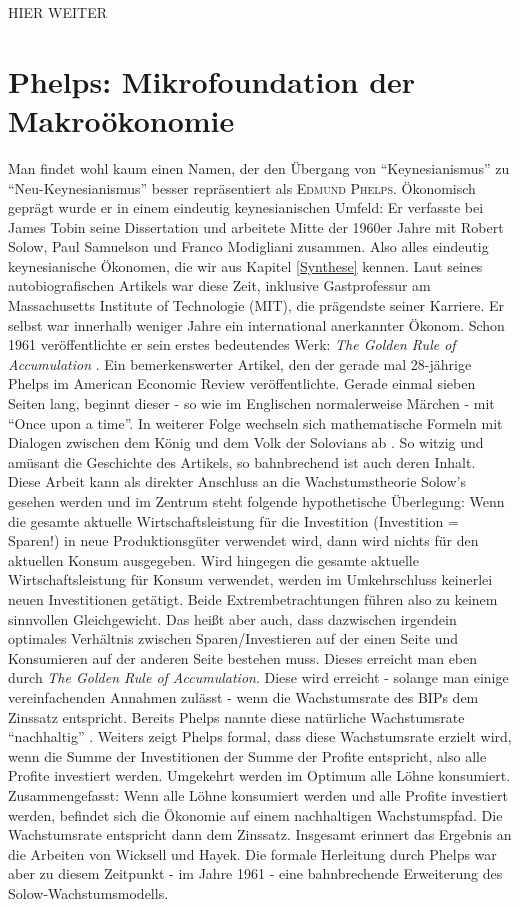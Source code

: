 HIER WEITER
 
 
 

\section{Phelps: Mikrofoundation der Makroökonomie}
\label{micmac}

Man findet wohl kaum einen Namen, der den Übergang von "`Keynesianismus"' zu "`Neu-Keynesianismus"' besser repräsentiert als \textsc{Edmund Phelps}. Ökonomisch geprägt wurde er in einem eindeutig keynesianischen Umfeld: Er verfasste bei James Tobin seine Dissertation und arbeitete Mitte der 1960er Jahre mit Robert Solow, Paul Samuelson und Franco Modigliani zusammen. Also alles eindeutig keynesianische Ökonomen, die wir aus Kapitel \ref{Synthese} kennen. Laut seines autobiografischen Artikels \textcite[S. 93]{Heertje1995} war diese Zeit, inklusive Gastprofessur am Massachusetts Institute of Technologie (MIT), die prägendste seiner Karriere. Er selbst war innerhalb weniger Jahre ein international anerkannter Ökonom. Schon 1961 veröffentlichte er sein erstes bedeutendes Werk: \textit{The Golden Rule of Accumulation} \parencite{Phelps1961}. Ein bemerkenswerter Artikel, den der gerade mal 28-jährige Phelps im American Economic Review veröffentlichte. Gerade einmal sieben Seiten lang, beginnt dieser - so wie im Englischen normalerweise Märchen  - mit "`Once upon a time"'. In weiterer Folge wechseln sich mathematische Formeln mit Dialogen zwischen dem König und dem Volk der Solovians ab \parencite[S. 640]{Phelps1961}. So witzig und amüsant die Geschichte des Artikels, so bahnbrechend ist auch deren Inhalt. Diese Arbeit kann als direkter Anschluss an die Wachstumstheorie Solow's gesehen werden und im Zentrum steht folgende hypothetische Überlegung: Wenn die gesamte aktuelle Wirtschaftsleistung für die Investition (Investition = Sparen!) in neue Produktionsgüter verwendet wird, dann wird nichts für den aktuellen Konsum ausgegeben. Wird hingegen die gesamte aktuelle Wirtschaftsleistung für Konsum verwendet, werden im Umkehrschluss keinerlei neuen Investitionen getätigt. Beide Extrembetrachtungen führen also zu keinem sinnvollen Gleichgewicht. Das heißt aber auch, dass dazwischen irgendein optimales Verhältnis zwischen Sparen/Investieren auf der einen Seite und Konsumieren auf der anderen Seite bestehen muss. Dieses erreicht man eben durch \textit{The Golden Rule of Accumulation}. Diese wird erreicht - solange man einige vereinfachenden Annahmen zulässt - wenn die Wachstumsrate des BIPs dem Zinssatz entspricht. Bereits Phelps nannte diese natürliche Wachstumsrate "`nachhaltig"' \parencite[S. 638]{Phelps1961}. Weiters zeigt Phelps formal, dass diese Wachstumsrate erzielt wird, wenn die Summe der Investitionen der Summe der Profite entspricht, also alle Profite investiert werden. Umgekehrt werden im Optimum alle Löhne konsumiert. Zusammengefasst: Wenn alle Löhne konsumiert werden und alle Profite investiert werden, befindet sich die Ökonomie auf einem nachhaltigen Wachstumspfad. Die Wachstumsrate entspricht dann dem Zinssatz. Insgesamt erinnert das Ergebnis an die Arbeiten von Wicksell und Hayek. Die formale Herleitung durch Phelps war aber zu diesem Zeitpunkt - im Jahre 1961 - eine bahnbrechende Erweiterung des Solow-Wachstumsmodells.

